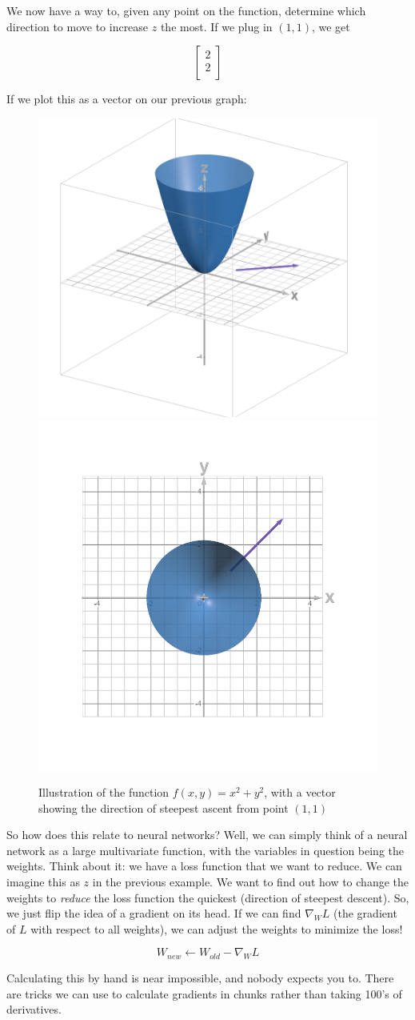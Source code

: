 \begin{flushleft}
    We now have a way to, given any point on the function, determine which direction to move to increase $z$ the most. If we plug in $(1,1)$, we get 
    
    $$\begin{bmatrix}
            2\\
            2\\
    \end{bmatrix}$$

    If we plot this as a vector on our previous graph:

    \begin{figure}[H]
        \centering
        \includegraphics[width=0.45\linewidth]{dl/x2y2line.png}
        \includegraphics[width=0.45\linewidth]{dl/x2y2lineabove.png}
        \caption{Illustration of the function $f(x, y) = x^2 + y^2$, with a vector showing the direction of steepest ascent from point $(1,1)$}
        \label{fig:x2y2_2}
    \end{figure}

    So how does this relate to neural networks? Well, we can simply think of a neural network as a large multivariate function, with the variables in question being the weights. Think about it: we have a loss function that we want to reduce. We can imagine this as $z$ in the previous example. We want to find out how to change the weights to \textit{reduce} the loss function the quickest (direction of steepest descent). So, we just flip the idea of a gradient on its head. If we can find $\nabla_W L$ (the gradient of $L$ with respect to all weights), we can adjust the weights to minimize the loss!

    $$W_{new} \leftarrow W_{old} - \nabla_W L$$

    Calculating this by hand is near impossible, and nobody expects you to. There are tricks we can use to calculate gradients in chunks rather than taking 100's of derivatives.
\end{flushleft}

